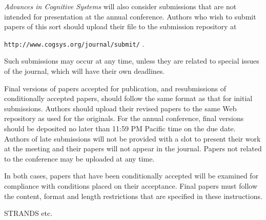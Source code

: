 \documentclass[11pt,letterpaper]{article}
\begin{document}
{\it Advances in Cognitive Systems\/} will also consider submissions
that are not intended for presentation at the annual conference. 
Authors who wish to submit papers of this sort should upload their
file to the submission repository at
\vskip 0.1in
\begin{small}
\centerline{{\tt http://www.cogsys.org/journal/submit/} .}
\end{small}
\vskip 0.08in
\noindent
Such submissions may occur at any time, unless they are related to 
special issues of the journal, which will have their own deadlines. 


Final versions of papers accepted for publication, and resubmissions 
of conditionally accepted papers, should follow the same format 
as that for initial submissions. Authors should upload their revised 
papers to the same Web repository as used for the originals. 
For the annual conference, final versions should be deposited no 
later than 11:59 PM Pacific time on the due date. Authors of late 
submissions will not be provided with a slot to present their work 
at the meeting and their papers will not appear in the journal.
Papers not related to the conference may be uploaded at any time. 

In both cases, papers that have been conditionally accepted will be
examined for compliance with conditions placed on their acceptance. 
Final papers must follow the content, format and length restrictions 
that are specified in these instructions.

 
\begin{acknowledgements} 
\noindent
STRANDS etc.
\end{acknowledgements} 

\vspace{-0.25in}

{\parindent -10pt\leftskip 10pt\noindent



}

\end{document}
